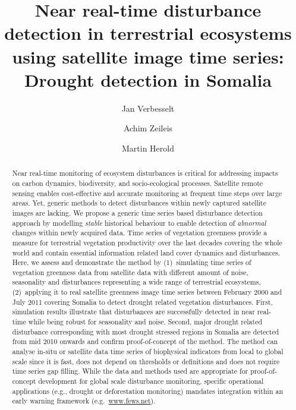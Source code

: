 \documentclass[authoryear,preprint,review,10pt]{elsarticle}
\begin{document}
\linenumbers

\begin{frontmatter}

    \title
    {
Near real-time disturbance detection in terrestrial ecosystems using satellite image time series: \\ Drought detection in Somalia
    }
    \author[WUR]{Jan Verbesselt}
    \author[UIBK]{Achim Zeileis}
    \author[WUR]{Martin Herold}
    \address[WUR]{Remote Sensing Team, Wageningen University, \\
           Droevendaalsesteeg 3, Wageningen 6708 PB, The Netherlands \\
           \emph{Ph}: + 31 317 48 52 68; \emph{Fax}: +31 317 419000}
    \address[UIBK]{Department of Statistics, Universit\"at Innsbruck \\
           Universit\"atsstr.~15, A-6020 Innsbruck, Austria}

\begin{abstract}
Near real-time monitoring of ecosystem disturbances is critical for addressing impacts on carbon dynamics, biodiversity, and socio-ecological processes. Satellite remote sensing enables cost-effective and accurate monitoring at frequent time steps over large areas. Yet, generic methods to detect disturbances within newly captured satellite images are lacking. 
We propose a generic time series based disturbance detection approach by modelling \emph{stable} historical behaviour to enable detection of \emph{abnormal} changes within newly acquired data.
Time series of vegetation greenness provide a measure for terrestrial vegetation productivity over the last decades covering the whole world and contain essential information related land cover dynamics and disturbances. Here, we assess and demonstrate the method by (1)~simulating time series of vegetation greenness data from satellite data with different amount of noise, seasonality and disturbances representing a wide range of terrestrial ecosystems, (2)~applying it to real satellite greenness image time series between February 2000 and July 2011 covering Somalia to  detect drought related vegetation disturbances.
First, simulation results illustrate that disturbances are successfully detected in near real-time while being robust for seasonality and noise. Second, major drought related disturbance corresponding with most drought stressed regions in Somalia are detected from mid 2010 onwards and confirm proof-of-concept of the method. The method can analyse in-situ or satellite data time series of biophysical indicators from local to global scale since it is fast, does not depend on thresholds or definitions and does not require time series gap filling. While the data and methods used are appropriate for proof-of-concept development for global scale disturbance monitoring, specific operational applications (e.g., drought or deforestation monitoring) mandates integration within an early warning framework (e.g.\ \url{www.fews.net}).
\end{abstract}


\end{frontmatter}
\end{document}
